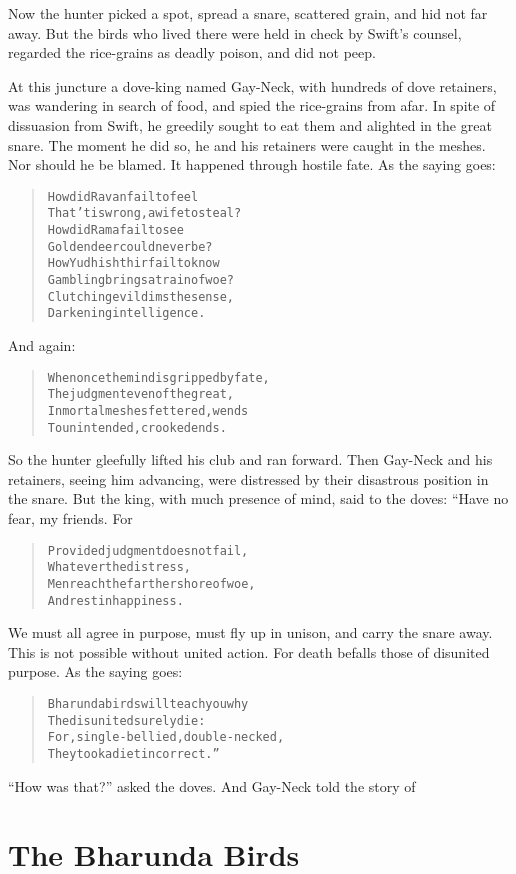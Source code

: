 \documentclass[article, twoside, 14pt]{memoir}
\renewenvironment{verbatim}{%
\begin{quote}%
\vskip -10pt%
\begin{alltt}\normalfont\large}{\end{alltt}%
\end{quote}%
\vskip -10pt
} %
\begin{document}
Now the hunter picked a spot, spread a snare, scattered grain, and
hid not far away. But the birds who lived there were held in check
by Swift's counsel, regarded the rice-grains as deadly poison, and
did not peep.

At this juncture a dove-king named Gay-Neck, with hundreds of dove
retainers, was wandering in search of food, and spied the
rice-grains from afar. In spite of dissuasion from Swift, he
greedily sought to eat them and alighted in the great snare.
The moment he did so, he and his retainers were caught in the
meshes. Nor should he be blamed. It happened through hostile fate.
As the saying goes:

\begin{verbatim}
How did Ravan fail to feel
That 'tis wrong, a wife to steal?
How did Rama fail to see
Golden deer could never be?
How Yudhishthir fail to know
Gambling brings a train of woe?
Clutching evil dims the sense,
Darkening intelligence.
\end{verbatim}
And again:

\begin{verbatim}
When once the mind is gripped by fate,
The judgment even of the great,
In mortal meshes fettered, wends
To unintended, crooked ends.
\end{verbatim}
So the hunter gleefully lifted his club and ran forward. Then
Gay-Neck and his retainers, seeing him advancing, were distressed
by their disastrous position in the snare. But the king, with much
presence of mind, said to the doves: “Have no fear, my friends.
For

\begin{verbatim}
Provided judgment does not fail,
    Whatever the distress,
Men reach the farther shore of woe,
    And rest in happiness.
\end{verbatim}
We must all agree in purpose, must fly up in unison, and carry the
snare away. This is not possible without united action. For death
befalls those of disunited purpose. As the saying goes:

\begin{verbatim}
Bharunda birds will teach you why
The disunited surely die:
For, single-bellied, double-necked,
They took a diet incorrect.”
\end{verbatim}
``How was that?'' asked the doves. And Gay-Neck told the story of

\chapter{The Bharunda Birds}
\end{document}
